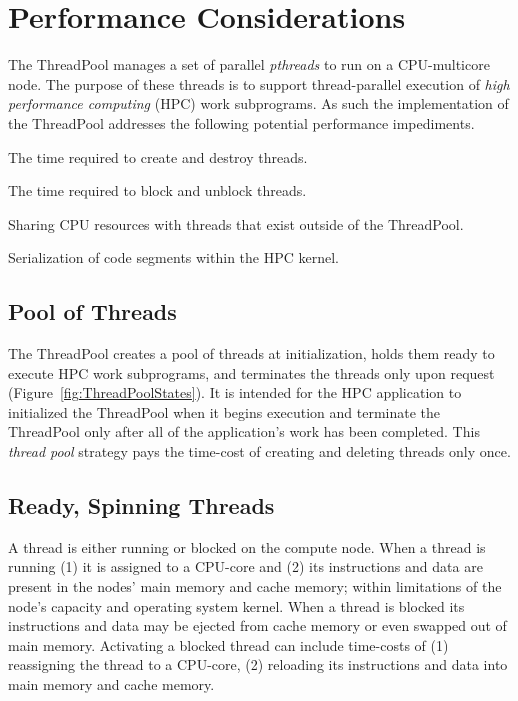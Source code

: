 \section{Performance Considerations}

The ThreadPool manages a set of parallel \emph{pthreads} \cite{pthreads:Standard} to run on a CPU-multicore node.
%
The purpose of these threads is to support thread-parallel execution of 
\emph{high performance computing} (HPC) work subprograms.
%
As such the implementation of the ThreadPool addresses the following potential performance impediments.
%
\begin{blist}
\item  The time required to create and destroy threads.
\item  The time required to block and unblock threads.
\item  Sharing CPU resources with threads that exist outside of the ThreadPool.
\item  Serialization of code segments within the HPC kernel.
\end{blist}



\subsection{Pool of Threads}

The ThreadPool creates a pool of threads at initialization, holds them ready to execute HPC work subprograms, and terminates the threads only upon request
(Figure~\ref{fig:ThreadPoolStates}).
%
It is intended for the HPC application to initialized the ThreadPool when it begins execution and terminate the ThreadPool only after all of the application's work has been completed.
%
This \emph{thread pool} strategy pays the time-cost of creating and deleting threads only once.



\subsection{Ready, Spinning Threads}

A thread is either running or blocked on the compute node.
%
When a thread is running 
(1) it is assigned to a CPU-core and
(2) its instructions and data are present in the nodes' main memory and cache memory; within limitations of the node's capacity and operating system kernel.
%
When a thread is blocked its instructions and data may be ejected from cache memory or even swapped out of main memory.
%
Activating a blocked thread can include time-costs of
(1) reassigning the thread to a CPU-core,
(2) reloading its instructions and data into main memory and cache memory.



